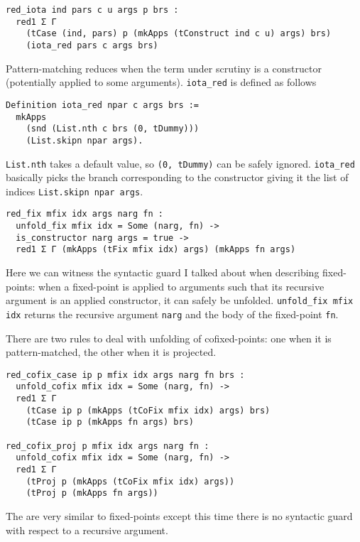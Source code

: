 \begin{verbatim}
red_iota ind pars c u args p brs :
  red1 Σ Γ
    (tCase (ind, pars) p (mkApps (tConstruct ind c u) args) brs)
    (iota_red pars c args brs)
\end{verbatim}
Pattern-matching reduces when the term under scrutiny is a constructor
(potentially applied to some arguments).
\texttt{iota_red} is defined as follows
\begin{verbatim}
Definition iota_red npar c args brs :=
  mkApps
    (snd (List.nth c brs (0, tDummy)))
    (List.skipn npar args).
\end{verbatim}
\texttt{List.nth} takes a default value, so
\texttt{(0, tDummy)} can be safely ignored. \texttt{iota_red}
basically picks the branch corresponding to the constructor giving it the list
of indices \texttt{List.skipn npar args}.

\begin{verbatim}
red_fix mfix idx args narg fn :
  unfold_fix mfix idx = Some (narg, fn) ->
  is_constructor narg args = true ->
  red1 Σ Γ (mkApps (tFix mfix idx) args) (mkApps fn args)
\end{verbatim}
Here we can witness the syntactic guard I talked about when describing
fixed-points: when a fixed-point is applied to arguments such that its recursive
argument is an applied constructor, it can safely be unfolded.
\texttt{unfold_fix mfix idx} returns the recursive argument
\texttt{narg} and the body of the fixed-point \texttt{fn}.

There are two rules to deal with unfolding of cofixed-points: one when it is
pattern-matched, the other when it is projected.
\begin{verbatim}
red_cofix_case ip p mfix idx args narg fn brs :
  unfold_cofix mfix idx = Some (narg, fn) ->
  red1 Σ Γ
    (tCase ip p (mkApps (tCoFix mfix idx) args) brs)
    (tCase ip p (mkApps fn args) brs)

red_cofix_proj p mfix idx args narg fn :
  unfold_cofix mfix idx = Some (narg, fn) ->
  red1 Σ Γ
    (tProj p (mkApps (tCoFix mfix idx) args))
    (tProj p (mkApps fn args))
\end{verbatim}
The are very similar to fixed-points except this time there is no syntactic
guard with respect to a recursive argument.

